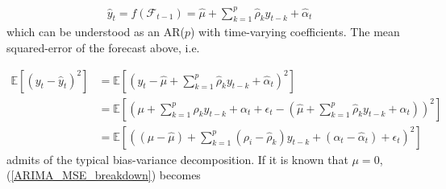 \documentclass{uiucthesis2021}
\def\E{\mathbb{E}} %
\theoremstyle{definition}
\begin{document}
  \begin{align}
  \hat{y}_{t} = f(\mathcal{F}_{t-1}) = \hat\mu + \sum^{p}_{k=1}\hat\rho_{k}y_{t-k} + \hat{\alpha}_{t}
  \end{align}
  which can be understood as an AR($p$) with time-varying coefficients.  The mean squared-error of the forecast above, i.e.
  
  \begin{align}
    \E[(y_{t}-\hat{y}_{t})^{2}] &= \E[(y_{t} - \hat\mu + \sum^{p}_{k=1}\hat\rho_{k}y_{t-k} + \hat{\alpha}_{t})^{2}]\\
    &= \E[(\mu + \sum^{p}_{k=1}\rho_{k}y_{t-k} + \alpha_{t} + \epsilon_{t}  - (\hat\mu + \sum^{p}_{k=1}\hat\rho_{k}y_{t-k} + \hat{\alpha}_{t}))^{2}] \\
    &= \E[((\mu - \hat\mu) + \sum^{p}_{k=1}(\rho_{i}-\hat\rho_{k})y_{t-k} + (\alpha_{t} - \hat{\alpha}_{t}) + \epsilon_{t} )^{2}]\label{ARIMA_MSE_breakdown}
    \end{align}
  admits of the typical bias-variance decomposition.  If it is known that $\mu = 0$, (\ref{ARIMA_MSE_breakdown}) becomes
  
\end{document}
